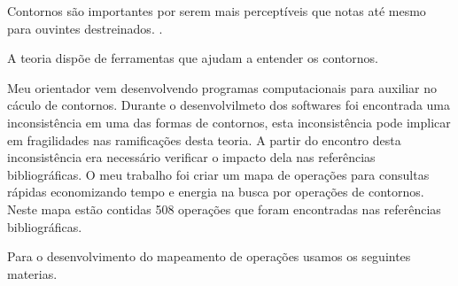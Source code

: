 \documentclass[11pt]{article}
\begin{document}
Contornos são importantes por serem mais perceptíveis que notas
até mesmo para ouvintes destreinados.
\cite[p. 225]{Marvin1987}.

A teoria dispõe de ferramentas que ajudam a entender os contornos.

Meu orientador vem desenvolvendo programas computacionais para
auxiliar no cáculo de contornos.
Durante o desenvolvilmeto dos softwares foi encontrada uma
inconsistência em uma das formas de contornos,
esta inconsistência pode implicar em fragilidades nas ramificações
desta teoria. A partir do encontro desta inconsistência era necessário
verificar o impacto dela nas referências bibliográficas. O meu
trabalho foi criar um mapa de operações para consultas rápidas
economizando tempo e energia na busca por operações de contornos.
Neste mapa estão contidas 508 operações que foram encontradas nas
referências bibliográficas.

\label{sec:materiais}

Para o desenvolvimento do mapeamento de operações usamos os seguintes
materias.

\end{document}
